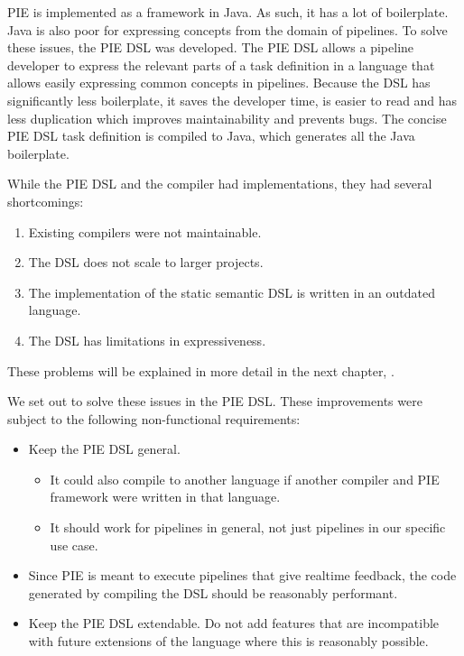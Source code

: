 \Ac{PIE} is implemented as a framework in Java.
As such, it has a lot of boilerplate.
Java is also poor for expressing concepts from the domain of pipelines.
To solve these issues, the \ac{PIE} \ac{DSL} was developed.
The \ac{PIE} \ac{DSL} allows a pipeline developer to express the relevant parts of a task definition in a language that allows easily expressing common concepts in pipelines.
Because the \ac{DSL} has significantly less boilerplate, it saves the developer time, is easier to read and has less duplication which improves maintainability and prevents bugs. 
The concise \ac{PIE} \ac{DSL} task definition is compiled to Java, which generates all the Java boilerplate.

While the \ac{PIE} \ac{DSL} and the compiler had implementations, they had several shortcomings:
\begin{enumerate}
  \item Existing compilers were not maintainable.
  \item The \ac{DSL} does not scale to larger projects.
  \item The implementation of the static semantic \ac{DSL} is written in an outdated language.
  \item The \ac{DSL} has limitations in expressiveness.
\end{enumerate}
These problems will be explained in more detail in the next chapter, .

We set out to solve these issues in the \ac{PIE} \ac{DSL}.
These improvements were subject to the following non-functional requirements:
\begin{itemize}
  \item Keep the \ac{PIE} \ac{DSL} general.
  \begin{itemize}
    \item It could also compile to another language if another compiler and \ac{PIE} framework were written in that language.
    \item It should work for pipelines in general, not just pipelines in our specific use case.
  \end{itemize}
  \item Since \ac{PIE} is meant to execute pipelines that give realtime feedback, the code generated by compiling the \ac{DSL} should be reasonably performant.
  \item Keep the \ac{PIE} \ac{DSL} extendable.
  Do not add features that are incompatible with future extensions of the language where this is reasonably possible.
\end{itemize}

